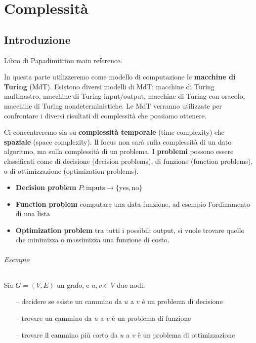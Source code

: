 \part{Complessità}


\chapter{Introduzione}

Libro di Papadimitriou main reference.

In questa parte utilizzeremo come modello di computazione le \textbf{macchine di Turing} (MdT). Esistono diversi modelli di MdT: macchine di Turing multinastro, macchine di Turing input/output, macchine di Turing con oracolo, macchine di Turing nondeterministiche. Le MdT verranno utilizzate per confrontare i diversi risultati di complessità che possiamo ottenere.

Ci concentreremo sia su \textbf{complessità temporale} (time complexity) che \textbf{spaziale} (space complexity). Il focus non sarà sulla complessità di un dato algoritmo, ma sulla complessità di un problema. I \textbf{problemi} possono essere classificati come di decisione (decision problems), di funzione (function problems), o di ottimizzazione (optimization problems).
\begin{itemize}
    \item \textbf{Decision problem} $P:\text{inputs}\to\{\text{yes},\text{no}\}$
    \item \textbf{Function problem} computare una data funzione, ad esempio l'ordinamento di una lista
    \item \textbf{Optimization problem} tra tutti i possibili output, si vuole trovare quello che minimizza o massimizza una funzione di costo. 
\end{itemize}

\paragraph{Esempio} Sia $G=(V,E)$ un grafo, e $u,v\in V$ due nodi. 
\begin{itemize}
    \item[--] decidere se esiste un cammino da $u$ a $v$ è un problema di decisione
    \item[--] trovare un cammino da $u$ a $v$ è un problema di funzione
    \item[--] trovare il cammino più corto da $u$ a $v$ è un problema di ottimizzazione
\end{itemize}

